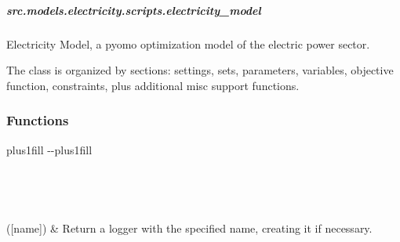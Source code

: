 \documentclass[letterpaper,10pt,english]{sphinxmanual}
\begin{document}
\sphinxstepscope


\subparagraph{src.models.electricity.scripts.electricity\_model}
\label{\detokenize{src.models.electricity.scripts.electricity_model:module-src.models.electricity.scripts.electricity_model}}\label{\detokenize{src.models.electricity.scripts.electricity_model:src-models-electricity-scripts-electricity-model}}\label{\detokenize{src.models.electricity.scripts.electricity_model::doc}}
\sphinxAtStartPar
Electricity Model, a pyomo optimization model of the electric power sector.

\sphinxAtStartPar
The class is organized by sections: settings, sets, parameters, variables, objective function,
constraints, plus additional misc support functions.
\subsubsection*{Functions}


\begin{savenotes}
\sphinxatlongtablestart
\sphinxthistablewithglobalstyle
\sphinxthistablewithnovlinesstyle
\makeatletter
  \LTleft \@totalleftmargin plus1fill
  \LTright\dimexpr\columnwidth-\@totalleftmargin-\linewidth\relax plus1fill
\makeatother
\begin{longtable}{}
\sphinxtoprule
\endfirsthead

\\
\sphinxtoprule
\endhead

\sphinxbottomrule
{}\\
\endfoot

\endlastfoot
\sphinxtableatstartofbodyhook

\sphinxAtStartPar
{}({[}name{]})
&
\sphinxAtStartPar
Return a logger with the specified name, creating it if necessary.
\\
\sphinxbottomrule
\end{longtable}
\sphinxtableafterendhook
\sphinxatlongtableend
\end{savenotes}
\end{document}
